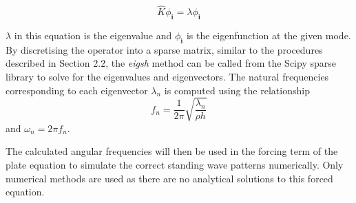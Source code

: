 \begin{equation}
    \hat{K}\phi_{\mathbf{i}} = \lambda \phi_{\mathbf{i}}
\end{equation}

$\lambda$ in this equation is the eigenvalue and $\phi_{\mathbf{i}}$ is the eigenfunction at the given mode. By discretising the operator into a sparse matrix, similar to the procedures described in Section 2.2, the \textit{eigsh} method can be called from the Scipy sparse library to solve for the eigenvalues and eigenvectors. The natural frequencies corresponding to each eigenvector $\lambda_n$ is computed using the relationship
\begin{equation}
   f_n = \frac{1}{2\pi}\sqrt{\frac{\lambda_n}{\rho h}} 
\end{equation}
and $\omega_n = 2\pi f_n$.

The calculated angular frequencies will then be used in the forcing term of the plate equation to simulate the correct standing wave patterns numerically. Only numerical methods are used as there are no analytical solutions to this forced equation.